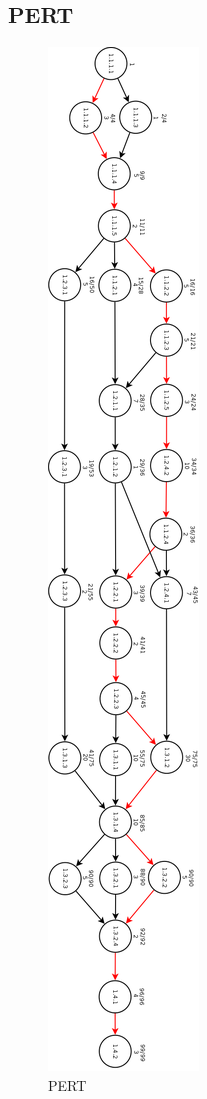 \documentclass[a4paper,11pt]{article}
\begin{document}
    \subsection{PERT}
    \begin{figure}[!Htb]
    	\centering
        \includegraphics[height=\textheight]{engsoft_pert2.png}
        \caption{PERT}
     	\label{PERT}
    \end{figure}
\end{document}
